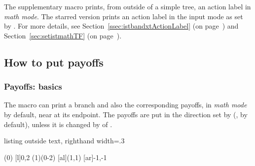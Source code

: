 The supplementary macro \cmd{\xtActionLabel} prints, from outside of a simple tree, an action label in \emph{math mode}.
The starred version \cmd{\xtActionLabel*} prints an action label in the input mode as set by \cmd{\setistmathTF*}.
For more details, see Section~\ref{ssec:istbandxtActionLabel} (on page~\pageref{ssec:istbandxtActionLabel}) and Section~\ref{sec:setistmathTF} (on page~\pageref{sec:setistmathTF}).



\subsection{How to put payoffs}

\subsubsection{Payoffs: basics}

The macro \icmd{\istb} can print a branch and also the corresponding payoffs, in \emph{math mode} by default, near at its endpoint.
The payoffs are put in the direction set by \icmd{\setistgrowdirection} (, by default), unless it is changed by  of \cmd{\istroot}.

\begin{tcblisting}{listing outside text, righthand width=.3\linewidth}
\begin{istgame}
\istroot(0)
  [l]{0,2}  
  \endist
\istroot(1)(0-2)
  \istb{\alpha}[al]{(1,1)}
  \istb{\beta}[ar]{-1,-1}
  \endist
\end{istgame}
\end{tcblisting}

